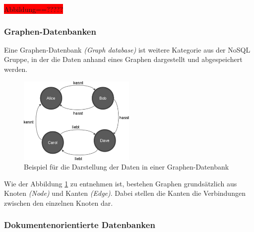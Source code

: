 \colorbox{red}{Abbildung==?????}

\subsubsection{Graphen-Datenbanken}
Eine Graphen-Datenbank \textit{(Graph database)} ist weitere Kategorie aus der NoSQL Gruppe, in der die Daten anhand eines Graphen dargestellt und abgespeichert werden.

\begin{figure}[H]
\centering
\includegraphics[width=0.5\textwidth]{resources/gdb}
\caption[Beispiel für die Darstellung der Daten in einer Graphen-Datenbank]{Beispiel für die Darstellung der Daten in einer Graphen-Datenbank\protect\footnotemark}
\label{img:gdb}
\end{figure}

Wie der Abbildung \ref{img:gdb} zu entnehmen ist, bestehen Graphen grundsätzlich aus Knoten \textit{(Node)} und Kanten \textit{(Edge)}. Dabei stellen die Kanten die Verbindungen zwischen den einzelnen Knoten dar.

\subsubsection{Dokumentenorientierte Datenbanken}

